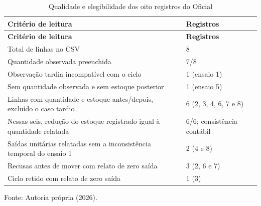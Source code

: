 {\small\setlength{\tabcolsep}{3pt}\begin{longtable}{p{}p{}}
\caption{Qualidade e elegibilidade dos oito registros do Oficial}\label{tab:indicadores-dispensacao}\\
\hline\textbf{Critério de leitura} & \textbf{Registros}\\\hline\endfirsthead
\hline\textbf{Critério de leitura} & \textbf{Registros}\\\hline\endhead
Total de linhas no CSV & 8\\\hline
Quantidade observada preenchida & 7/8\\\hline
Observação tardia incompatível com o ciclo & 1 (ensaio 1)\\\hline
Sem quantidade observada e sem estoque posterior & 1 (ensaio 5)\\\hline
Linhas com quantidade e estoque antes/depois, excluído o caso tardio & 6 (2, 3, 4, 6, 7 e 8)\\\hline
Nessas seis, redução do estoque registrado igual à quantidade relatada & 6/6; consistência contábil\\\hline
Saídas unitárias relatadas sem a inconsistência temporal do ensaio 1 & 2 (4 e 8)\\\hline
Recusas antes de mover com relato de zero saída & 3 (2, 6 e 7)\\\hline
Ciclo retido com relato de zero saída & 1 (3)\\\hline
\end{longtable}\noindent Fonte: Autoria própria (2026).\par}
